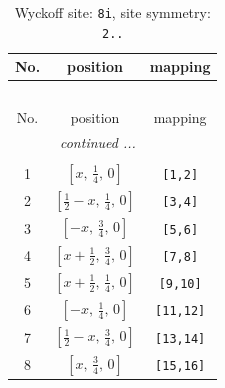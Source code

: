 \documentclass[fleqn,8pt]{jsarticle}
\begin{document}
\renewcommand{\arraystretch}{1.2}
\begin{longtable}{ccc}
\caption{Wyckoff site: {\tt 8i}, site symmetry: {\tt 2..}}
 \\
 \hline \hline
No. & position & mapping \\ \hline \endfirsthead

\multicolumn{2}{l}{\tablename\ \thetable{}} \\
 \hline \hline
No. & position & mapping \\ \hline \endhead

 \hline \hline
\multicolumn{2}{r}{\footnotesize\it continued ...} \\ \endfoot

 \hline \hline
\multicolumn{2}{r}{} \\ \endlastfoot

1 & $\left[ x,\, \frac{1}{4},\, 0 \right]$ & {\tt [1,2]} \\ \hline
2 & $\left[ \frac{1}{2} - x,\, \frac{1}{4},\, 0 \right]$ & {\tt [3,4]} \\ \hline
3 & $\left[ - x,\, \frac{3}{4},\, 0 \right]$ & {\tt [5,6]} \\ \hline
4 & $\left[ x + \frac{1}{2},\, \frac{3}{4},\, 0 \right]$ & {\tt [7,8]} \\ \hline
5 & $\left[ x + \frac{1}{2},\, \frac{1}{4},\, 0 \right]$ & {\tt [9,10]} \\ \hline
6 & $\left[ - x,\, \frac{1}{4},\, 0 \right]$ & {\tt [11,12]} \\ \hline
7 & $\left[ \frac{1}{2} - x,\, \frac{3}{4},\, 0 \right]$ & {\tt [13,14]} \\ \hline
8 & $\left[ x,\, \frac{3}{4},\, 0 \right]$ & {\tt [15,16]} \\
\end{longtable}
\renewcommand{\arraystretch}{1.2}
\end{document}
